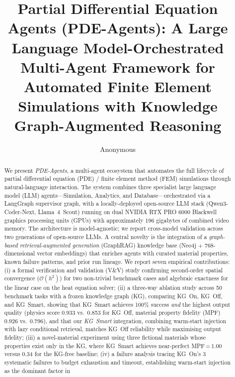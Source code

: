 \documentclass[preprint,review,12pt]{elsarticle}
\begin{document}
\begin{frontmatter}

\title{Partial Differential Equation Agents (PDE-Agents):
       A Large Language Model-Orchestrated Multi-Agent
       Framework for Automated Finite Element Simulations
       with Knowledge Graph-Augmented Reasoning}

\author[anon]{Anonymous}

\begin{abstract}
We present \textit{PDE-Agents}, a multi-agent ecosystem that automates the
full lifecycle of partial differential equation (PDE) / finite element method
(FEM) simulations through natural-language interaction.  The system combines
three specialist large language model (LLM) agents---Simulation, Analytics,
and Database---orchestrated via a LangGraph supervisor graph, with a
locally-deployed open-source LLM stack (Qwen3-Coder-Next, Llama~4~Scout)
running on dual NVIDIA RTX PRO 6000 Blackwell graphics processing units
(GPUs) with approximately 196 gigabytes of combined video memory.  The
architecture is model-agnostic; we report cross-model validation across two
generations of open-source LLMs.
A central novelty is the integration of a \emph{graph-based
retrieval-augmented generation} (GraphRAG) knowledge base (Neo4j +
768-dimensional vector embeddings) that enriches agents with curated material
properties, known failure patterns, and prior run lineage.
We report seven empirical contributions: (i) a formal verification and
validation (V\&V) study confirming second-order spatial convergence
(\(\mathcal{O}(h^2)\)) for two non-trivial benchmark cases and algebraic
exactness for the linear case on the heat equation solver; (ii) a three-way
ablation study across 50 benchmark tasks with a frozen knowledge graph (KG),
comparing KG~On, KG~Off, and KG~Smart, showing that KG~Smart achieves
100\% success \emph{and} the highest output quality (physics score 0.933
vs.\ 0.853 for KG~Off, material property fidelity (MPF) 0.926 vs.\ 0.796),
and that our \emph{KG~Smart} integration, combining warm-start injection
with lazy conditional retrieval, matches KG~Off reliability while maximising
output fidelity; (iii) a novel-material experiment using three fictional
materials whose properties exist only in the KG, where KG~Smart achieves
near-perfect MPF\,=\,1.00 versus 0.34 for the KG-free baseline; (iv) a
failure analysis tracing KG~On's 3 systematic failures to budget exhaustion
and timeout, establishing warm-start injection as the dominant factor in

\end{abstract}
\end{frontmatter}
\end{document}

